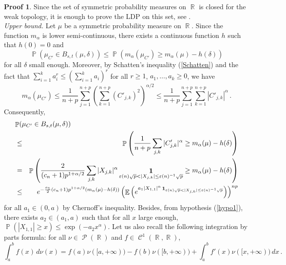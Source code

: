 \documentclass[11pt,a4paper]{article}
\DeclareMathOperator{\E}{\mathbb{E}}
\DeclareMathOperator{\R}{\mathbb{R}}
\DeclareMathOperator{\PR}{\mathbb{P}}
\DeclareMathOperator{\CC}{\mathcal{C}}
\DeclareMathOperator{\PP}{\mathcal{P}}
\DeclareMathOperator{\1}{\mathbf{1}}
\theoremstyle{definition}
\newtheorem*{Proof}{Proof}
\begin{document}
\begin{Proof}
Since the set of symmetric probability measures on $\R$ is closed for the weak topology, it is enough to prove the LDP on this set, see \cite[Lemma 4.1.5]{DZ}.\\

\emph{Upper bound.} Let $\mu$ be a symmetric probability measure on $\R$. Since the function $m_{\alpha}$ is lower semi-continuous, there exists a continuous function $h$ such that $h(0)=0$ and
\begin{displaymath}
\PR(\mu_{C'} \in B_{s,t}(\mu,\delta)) \le \PR(m_{\alpha}(\mu_{C'}) \ge m_{\alpha}(\mu) - h(\delta))
\end{displaymath}
for all $\delta$ small enough. Moreover, by Schatten's inequality (\ref{Schatten}) and the fact that $\sum_{i=1}^k a_i^r \le \left( \sum_{i=1}^k a_i \right)^r$ for all $r \ge 1$, $a_1,\ldots,a_k \ge 0$, we have
\begin{displaymath}
m_{\alpha}(\mu_{C'}) \le \frac{1}{n+p} \sum_{j=1}^{n+p} \left( \sum_{k=1}^{n+p} (C'_{j,k})^2 \right)^{\alpha/2} \le \frac{1}{n+p} \sum_{j=1}^{n+p} \sum_{k=1}^{n+p} |C'_{j,k}|^{\alpha} \, .
\end{displaymath}
Consequently,
\begin{eqnarray*}
\lefteqn{   \PR(\mu_{C'} \in B_{s,t}(\mu,\delta))   } \\
& \le & \PR \left( \frac{1}{n+p} \sum_{j,k} |C'_{j,k}|^{\alpha} \ge m_{\alpha}(\mu) - h(\delta) \right) \\
& = & \PR \left( \frac{2}{(c_n+1)p^{1+\alpha/2}} \sum_{j,k} |X_{j,k}|^{\alpha} \1_{\varepsilon(n) \sqrt{p} < |X_{j,k}| \le \varepsilon(n)^{-1} \sqrt{p}} \ge m_{\alpha}(\mu) - h(\delta) \right) \\
& \le & e^{-\frac{a_1}{2} (c_n+1) p^{1+\alpha/2} (m_{\alpha}(\mu) - h(\delta))} \left( \E \left( e^{a_1 |X_{1,1}|^{\alpha} \1_{\varepsilon(n) \sqrt{p} < |X_{j,k}| \le \varepsilon(n)^{-1} \sqrt{p}}} \right) \right)^{np}
\end{eqnarray*}
for all $a_1 \in (0,a)$ by Chernoff's inequality. Besides, from hypothesis (\ref{hypo1}), there exists $a_2 \in (a_1,a)$ such that for all $x$ large enough, $\PR(|X_{1,1}| \ge x) \le \exp(-a_2 x^{\alpha})$. Let us also recall the following integration by parts formula: for all $\nu \in \PP(\R)$ and $f \in \CC^1(\R,\R)$,
\begin{displaymath}
\int_a^b f(x) \, d\nu(x) = f(a) \nu([a,+\infty)) - f(b) \nu([b,+\infty)) + \int_a^b f'(x) \nu([x,+\infty)) \, dx \, .
\end{displaymath}


\end{Proof}
\end{document}
